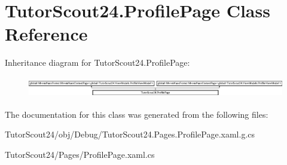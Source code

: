 \hypertarget{class_tutor_scout24_1_1_profile_page}{}\section{Tutor\+Scout24.\+Profile\+Page Class Reference}
\label{class_tutor_scout24_1_1_profile_page}
Inheritance diagram for Tutor\+Scout24.\+Profile\+Page\+:\begin{figure}[H]
\begin{center}
\leavevmode
\includegraphics[height=0.907618cm]{class_tutor_scout24_1_1_profile_page}
\end{center}
\end{figure}


The documentation for this class was generated from the following files\+:\begin{DoxyCompactItemize}
\item 
Tutor\+Scout24/obj/\+Debug/Tutor\+Scout24.\+Pages.\+Profile\+Page.\+xaml.\+g.\+cs\item 
Tutor\+Scout24/\+Pages/Profile\+Page.\+xaml.\+cs\end{DoxyCompactItemize}
